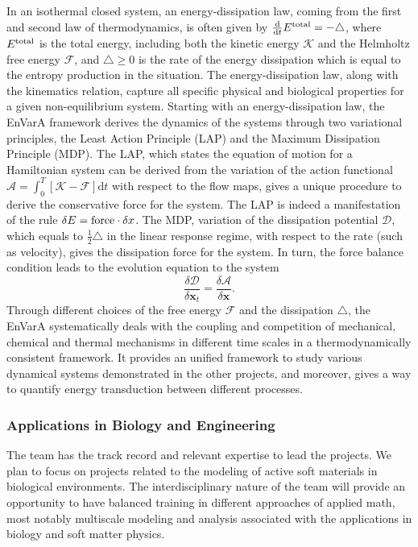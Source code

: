 \documentclass[11pt]{NSFamsart}
\newcommand{\dd}{\mathrm{d}}
\newcommand{\x}{{\bm x}}
\begin{document}
In an isothermal closed system, an energy-dissipation law, coming from the first and second law of thermodynamics, is often given by $\frac{\dd}{\dd t} E^{\rm total} = - \triangle$,
where $E^{\rm total}$ is the total energy, including both the kinetic energy $\mathcal{K}$ and the Helmholtz free energy $\mathcal{F}$, and $\triangle \geq 0$ is the rate of the energy dissipation which is equal to the entropy production in the situation. The energy-dissipation law, along with the kinematics relation, %
capture all specific physical and biological properties for a given non-equilibrium system. Starting with an energy-dissipation law, the EnVarA framework derives the dynamics of the systems through two variational principles, the Least Action Principle (LAP) and the Maximum Dissipation Principle (MDP). The LAP, which states the equation of motion for a Hamiltonian system
can be derived from the variation of the action functional $\mathcal{A} = \int_{0}^T [\mathcal{K} - \mathcal{F}] \dd t$ with respect to the flow maps, gives a unique procedure to derive the conservative force for the system. The LAP is indeed a manifestation of the rule $\delta E = {\rm force} \cdot \delta x$. The MDP, variation of the dissipation potential $\mathcal{D}$, which equals to $\frac{1}{2}\triangle$ in the linear response regime, with respect to the rate (such as velocity), gives the dissipation force for the system. In turn, the force balance condition leads to the evolution equation to the system
\begin{equation*}
\frac{\delta \mathcal{D}}{\delta \x_t} = \frac{\delta \mathcal{A}}{\delta \x}.
\end{equation*}
Through different choices of the free energy $\mathcal{F}$ and the dissipation $\triangle$,
the EnVarA %
systematically deals with the coupling and competition of mechanical, chemical and thermal mechanisms in different time scales in a thermodynamically consistent framework. It 
provides an unified framework to study various
dynamical systems demonstrated in the other projects, and
moreover, gives a way to quantify energy transduction between different processes.  

\subsubsection*{Applications in Biology and Engineering}
The team has the track record and relevant expertise to lead the projects. We plan to focus on projects related to the modeling of active soft materials in biological environments.
The interdisciplinary nature of the team will provide an opportunity to have balanced training in different approaches of applied math, most notably multiscale modeling and analysis associated with the applications in biology and soft matter physics.
\end{document}
